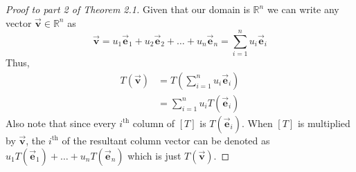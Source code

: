 \documentclass[12pt]{article}
\theoremstyle{remark}
\let\oldvec = \vec
\renewcommand{\vec}[1]{\oldvec{\mathbf{#1}}}
\numberwithin{equation}{section}
\begin{document}
\begin{proof}[Proof to part 2 of Theorem 2.1] 
	Given that our domain is $ \mathbb{R}^n $ we can write any vector $ \vec{v} \in \mathbb{R}^n $ as \[\vec{v} = u_{1}\vec{e}_{1} + u_{2}\vec{e}_{2} + \ldots + u_{n}\vec{e}_{n} = %
	\sum^{n}_{i=1} u_{i}\vec{e}_{i} \]
	Thus, 
	\begin{align*}
		T(\vec{v}) &= T\left(\sum^{n}_{i=1} u_{i}\vec{e}_{i}\right) \\ 
			   &= \sum^{n}_{i=1} u_{i}T(\vec{e}_{i}) 
	\end{align*}
	Also note that since every $ i^{\text{th}} $ column of $ [T] $ is $ T(\vec{e}_{i}) $. When $ [T] $ is multiplied by $ \vec{v} $, the $ i^{\text{th}} $ of the resultant column vector can be denoted as $ u_{1}T(\vec{e}_{1}) + \ldots + u_{n}T(\vec{e}_{n}) $ which is just $ T(\vec{v}) $. 
\end{proof}
\end{document}
